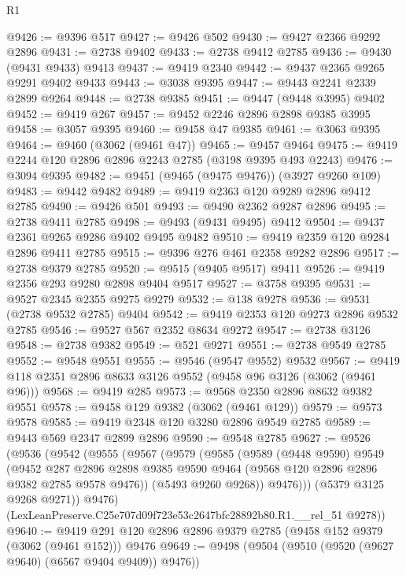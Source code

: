 \begin{lexlean}{R1}
\begin{coremodule}
@9426 := @9396 @517
@9427 := @9426 @502
@9430 := @9427 @2366 @9292 @2896
@9431 := @2738 @9402
@9433 := @2738 @9412 @2785
@9436 := @9430 (@9431 @9433) @9413
@9437 := @9419 @2340
@9442 := @9437 @2365 @9265 @9291 @9402 @9433
@9443 := @3038 @9395
@9447 := @9443 @2241 @2339 @2899 @9264
@9448 := @2738 @9385
@9451 := @9447 (@9448 @3995) @9402
@9452 := @9419 @267
@9457 := @9452 @2246 @2896 @2898 @9385 @3995
@9458 := @3057 @9395
@9460 := @9458 @47 @9385
@9461 := @3063 @9395
@9464 := @9460 (@3062 (@9461 @47))
@9465 := @9457 @9464
@9475 := @9419 @2244 @120 @2896 @2896 @2243 @2785 (@3198 @9395 @493 @2243)
@9476 := @3094 @9395
@9482 := @9451 (@9465 (@9475 @9476)) (@3927 @9260 @109)
@9483 := @9442 @9482
@9489 := @9419 @2363 @120 @9289 @2896 @9412 @2785
@9490 := @9426 @501
@9493 := @9490 @2362 @9287 @2896
@9495 := @2738 @9411 @2785
@9498 := @9493 (@9431 @9495) @9412
@9504 := @9437 @2361 @9265 @9286 @9402 @9495 @9482
@9510 := @9419 @2359 @120 @9284 @2896 @9411 @2785
@9515 := @9396 @276 @461 @2358 @9282 @2896
@9517 := @2738 @9379 @2785
@9520 := @9515 (@9405 @9517) @9411
@9526 := @9419 @2356 @293 @9280 @2898 @9404 @9517
@9527 := @3758 @9395
@9531 := @9527 @2345 @2355 @9275 @9279
@9532 := @138 @9278
@9536 := @9531 (@2738 @9532 @2785) @9404
@9542 := @9419 @2353 @120 @9273 @2896 @9532 @2785
@9546 := @9527 @567 @2352 @8634 @9272
@9547 := @2738 @3126
@9548 := @2738 @9382
@9549 := @521 @9271
@9551 := @2738 @9549 @2785
@9552 := @9548 @9551
@9555 := @9546 (@9547 @9552) @9532
@9567 := @9419 @118 @2351 @2896 @8633 @3126 @9552 (@9458 @96 @3126 (@3062 (@9461 @96)))
@9568 := @9419 @285
@9573 := @9568 @2350 @2896 @8632 @9382 @9551
@9578 := @9458 @129 @9382 (@3062 (@9461 @129))
@9579 := @9573 @9578
@9585 := @9419 @2348 @120 @3280 @2896 @9549 @2785
@9589 := @9443 @569 @2347 @2899 @2896
@9590 := @9548 @2785
@9627 := @9526
    (@9536
      (@9542
        (@9555
          (@9567
            (@9579
              (@9585
                (@9589
                  (@9448 @9590)
                  @9549
                  (@9452
                    @287
                    @2896
                    @2898
                    @9385
                    @9590
                    @9464
                    (@9568 @120 @2896 @2896 @9382 @2785 @9578 @9476))
                  (@5493 @9260 @9268))
                @9476)))
          (@5379 @3125 @9268 @9271))
        @9476)
      (LexLeanPreserve.C25e707d09f723e53c2647bfc28892b80.R1.__rel_51 @9278))
@9640 := @9419 @291 @120 @2896 @2896 @9379 @2785 (@9458 @152 @9379 (@3062 (@9461 @152))) @9476
@9649 := @9498 (@9504 (@9510 (@9520 (@9627 @9640) (@6567 @9404 @9409)) @9476))

\end{coremodule}
\end{lexlean}
